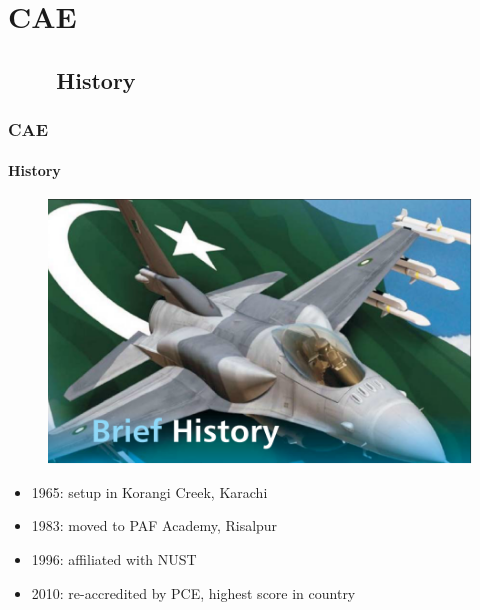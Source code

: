 







\section{CAE}
\subsection{\ \ \ \ History}
\begin{frame}
\frametitle{CAE}
\framesubtitle{History}
\mypagenum{}
\begin{figure}
\centering
\includegraphics[height=0.3\textheight]{figs/logo_CAE_history.png}
\end{figure}
\begin{itemize}
\item 1965: setup in Korangi Creek, Karachi
\item 1983: moved to PAF Academy, Risalpur
\item 1996: affiliated with NUST
\item 2010: re-accredited by PCE, highest score in country 
\end{itemize}
\end{frame}


